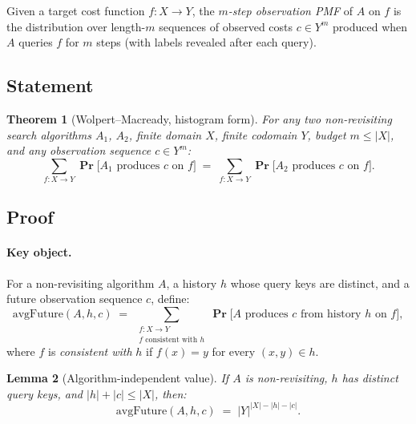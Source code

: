 \documentclass[11pt]{article}
\newtheorem{theorem}{Theorem}[section]
\newtheorem{lemma}[theorem]{Lemma}
\theoremstyle{remark}
\DeclareMathOperator{\Prob}{\mathbf{Pr}}
\newcommand{\avgFuture}{\mathrm{avgFuture}}
\newcommand{\card}[1]{|#1|}
\begin{document}
Given a target cost function $f : X \to Y$, the \emph{$m$-step
observation PMF} of $A$ on $f$ is the distribution over length-$m$
sequences of observed costs $c \in Y^m$ produced when $A$ queries $f$
for $m$ steps (with labels revealed after each query).

\subsection{Statement}

\begin{theorem}[Wolpert--Macready, histogram form]
\label{thm:wm}
  For any two non-revisiting search algorithms $A_1$, $A_2$, finite
  domain $X$, finite codomain $Y$, budget $m \le \card{X}$, and any
  observation sequence $c \in Y^m$:
  \[
    \sum_{f : X \to Y} \Prob\bigl[A_1 \text{ produces } c
      \text{ on } f\bigr]
    \;=\;
    \sum_{f : X \to Y} \Prob\bigl[A_2 \text{ produces } c
      \text{ on } f\bigr].
  \]
\end{theorem}

\subsection{Proof}

\paragraph{Key object.}
For a non-revisiting algorithm $A$, a history $h$ whose query keys are
distinct, and a future observation sequence $c$, define:
\[
  \avgFuture(A, h, c)
  \;=\;
  \sum_{\substack{f : X \to Y \\ f \text{ consistent with } h}}
    \Prob\bigl[A \text{ produces } c \text{ from history } h \text{ on } f\bigr],
\]
where $f$ is \emph{consistent with} $h$ if $f(x) = y$ for every
$(x, y) \in h$.

\begin{lemma}[Algorithm-independent value]
\label{lem:avgfuture}
  If $A$ is non-revisiting, $h$ has distinct query keys, and
  $\card{h} + \card{c} \le \card{X}$, then:
  \[
    \avgFuture(A, h, c) \;=\; \card{Y}^{\card{X} - \card{h} - \card{c}}.
  \]
\end{lemma}
\end{document}
